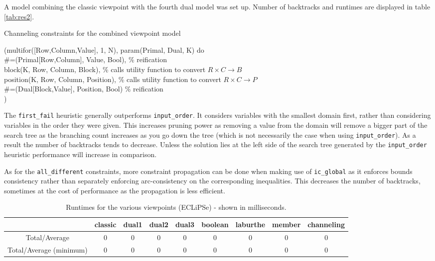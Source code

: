 A model combining the classic viewpoint with the fourth dual model was set up. Number of backtracks and runtimes are displayed in table \ref{tab:res2}.

\begin{algorithm}[H]
\caption{Channeling constraints for the combined viewpoint model}\label{channeling}
\small
(multifor([Row,Column,Value], 1, N), param(Primal, Dual, K) do \\
    \#=(Primal[Row,Column], Value, Bool), \% reification \\
    block(K, Row, Column, Block), \% calls utility function to convert $R\times C\rightarrow B$ \\
    position(K, Row, Column, Position), \% calls utility function to convert $R\times C\rightarrow P$ \\
    \#=(Dual[Block,Value], Position, Bool) \% reification \\
)
\end{algorithm}

The \texttt{first\_fail} heuristic generally outperforms \texttt{input\_order}. It considers variables with the smallest domain first, rather than considering variables in the order they were given. This increases pruning power as removing a value from the domain will remove a bigger part of the search tree as the branching count increases as you go down the tree (which is not necessarily the case when using \texttt{input\_order}). As a result the number of backtracks tends to decrease. Unless the solution lies at the left side of the search tree generated by the \texttt{input\_order} heuristic performance will increase in comparison. \\\par

As for the \texttt{all\_different} constraints, more constraint propagation can be done when making use of \texttt{ic\_global} as it enforces bounds consistency rather than separately enforcing arc-consistency on the corresponding inequalities. This decreases the number of backtracks, sometimes at the cost of performance as the propagation is less efficient.

\begin{table}[]
\bgroup
\def\arraystretch{1.3}
\begin{tabular}{ccccccccc}
\multicolumn{1}{l}{}    & classic & dual1 & dual2 & dual3 & boolean & laburthe & member & channeling \\ \hline
Total/Average & 0 & 0 & 0 & 0 & 0 & 0 & 0 & 0 \\
Total/Average (minimum) & 0 & 0 & 0 & 0 & 0 & 0 & 0 & 0                    
\end{tabular}
\egroup
\caption{Runtimes for the various viewpoints (ECLiPSe) - shown in milliseconds.}
\label{tab:res1}
\end{table}


